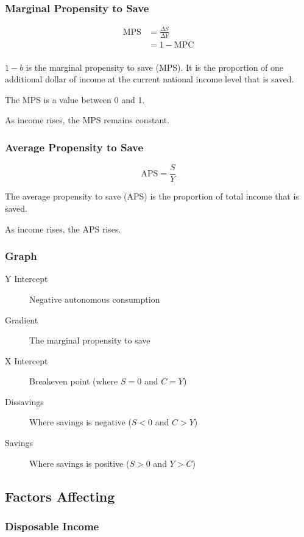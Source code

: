 \documentclass[a4paper,11pt]{report}
\begin{document}
\subsubsection{Marginal Propensity to Save}

$$
\begin{aligned}
\mbox{MPS} & = \frac{\Delta S}{\Delta Y} \\
& = 1 - \mbox{MPC} \\
\end{aligned}
$$

$1 - b$ is the marginal propensity to save (MPS). It is the proportion of one
additional dollar of income at the current national income level that is saved.

The MPS is a value between 0 and 1.

As income rises, the MPS remains constant.

\subsubsection{Average Propensity to Save}

$$
\mbox{APS} = \frac{S}{Y}
$$

The average propensity to save (APS) is the proportion of total income that is
saved.

As income rises, the APS rises.

\subsubsection{Graph}


\begin{description}
\item [Y Intercept] Negative autonomous consumption
\item [Gradient] The marginal propensity to save
\item [X Intercept] Breakeven point (where $S = 0$ and $C = Y$)
\item [Dissavings] Where savings is negative ($S < 0$ and $C > Y$)
\item [Savings] Where savings is positive ($S > 0$ and $Y > C$)
\end{description}

\subsection{Factors Affecting}

\subsubsection{Disposable Income}
\end{document}
